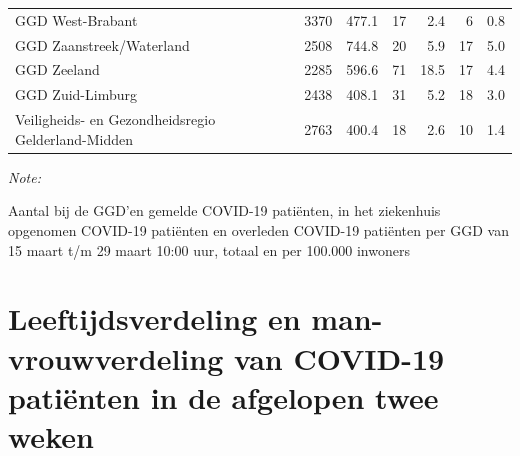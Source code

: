\documentclass[
  english,
  man,floatsintext]{apa6}
\begin{document}
\begin{table}
\begin{threeparttable}
\begin{tabular}{lrrrrrr}
GGD West-Brabant & 3370 & 477.1 & 17 & 2.4 & 6 & 0.8\\
GGD Zaanstreek/Waterland & 2508 & 744.8 & 20 & 5.9 & 17 & 5.0\\
GGD Zeeland & 2285 & 596.6 & 71 & 18.5 & 17 & 4.4\\
GGD Zuid-Limburg & 2438 & 408.1 & 31 & 5.2 & 18 & 3.0\\
Veiligheids- en Gezondheidsregio Gelderland-Midden & 2763 & 400.4 & 18 & 2.6 & 10 & 1.4\\
\bottomrule
\end{tabular}
\begin{tablenotes}
\item \textit{Note: } 
\item Aantal bij de GGD’en gemelde COVID-19 patiënten, in het ziekenhuis opgenomen COVID-19 patiënten en overleden COVID-19 patiënten per GGD van 15 maart t/m 29 maart 10:00 uur, totaal en per 100.000 inwoners
\end{tablenotes}
\end{threeparttable}
\endgroup{}
\end{table}

\newpage

\hypertarget{leeftijdsverdeling-en-man-vrouwverdeling-van-covid-19-patiuxebnten-in-de-afgelopen-twee-weken}{%
\section{Leeftijdsverdeling en man-vrouwverdeling van COVID-19 patiënten in de afgelopen twee weken}\label{leeftijdsverdeling-en-man-vrouwverdeling-van-covid-19-patiuxebnten-in-de-afgelopen-twee-weken}}
\end{document}
